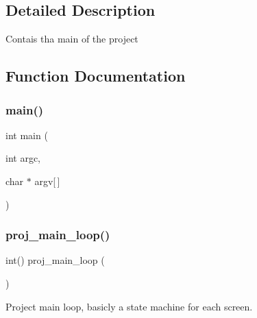 \subsection{Detailed Description}
Contais tha main of the project 

\subsection{Function Documentation}
\mbox{\label{group__Proj_ga0ddf1224851353fc92bfbff6f499fa97}} 
\subsubsection{\texorpdfstring{main()}{main()}}
{\footnotesize\ttfamily int main (\begin{DoxyParamCaption}\item[{int}]{argc,  }\item[{char $\ast$}]{argv\mbox{[}$\,$\mbox{]} }\end{DoxyParamCaption})}

\mbox{\label{group__Proj_ga33bde23e0d2bbde847401c5ac6fb62e0}} 
\subsubsection{\texorpdfstring{proj\+\_\+main\+\_\+loop()}{proj\_main\_loop()}}
{\footnotesize\ttfamily int() proj\+\_\+main\+\_\+loop (\begin{DoxyParamCaption}{ }\end{DoxyParamCaption})}



Project main loop, basicly a state machine for each screen. 

